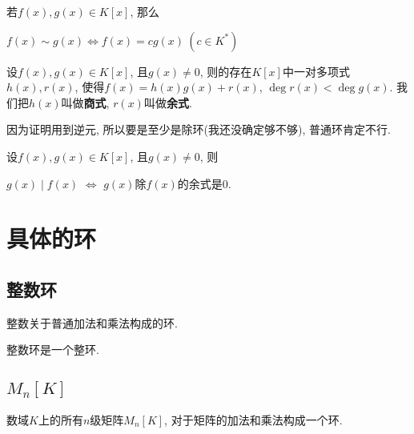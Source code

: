 \begin{Proposition}
若$f(x), g(x) \in K[x]$, 那么
\begin{tightcenter}
$f(x) \sim g(x) \iff f(x) = c g(x)~(c \in K^*)$
\end{tightcenter}
\end{Proposition}

\begin{Theorem}[带余除法]
设$f(x), g(x) \in K[x]$, 且$g(x) \neq 0$, 则\;\;的存在$K[x]$中一对多项式$h(x), r(x)$,
使得$f(x) = h(x) g(x) + r(x)$, $\deg r(x) < \deg g(x)$. 我们把$h(x)$叫做\textbf{商式},
$r(x)$叫做\textbf{余式}.
\end{Theorem}

\begin{Note}
因为证明用到逆元, 所以要是至少是除环(我还没确定够不够), 普通环肯定不行.
\end{Note}

\begin{Corollary}
设$f(x), g(x) \in K[x]$, 且$g(x) \neq 0$, 则
\begin{tightcenter}
$g(x) \mid f(x)$ $\iff$ $g(x)$除$f(x)$的余式是$0$.
\end{tightcenter}
\end{Corollary}


\section{具体的环}

\subsection{整数环} %

\begin{Definition}[整数环]
整数关于普通加法和乘法构成的环.
\end{Definition}

\begin{Proposition}
整数环是一个整环.
\end{Proposition}

\subsection{$M_n[K]$}

\begin{Note}
数域$K$上的所有$n$级矩阵$M_n[K]$, 对于矩阵的加法和乘法构成一个环.
\end{Note}